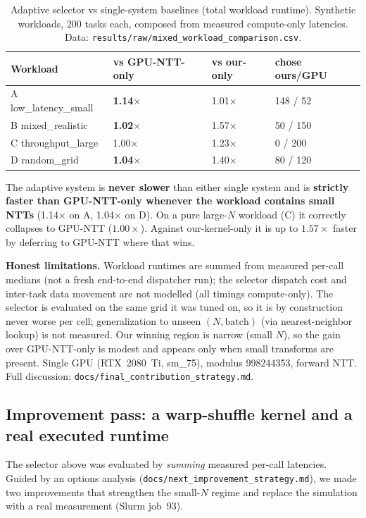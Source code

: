 \documentclass[11pt,a4paper]{article}
\begin{document}
\begin{table}[h]
\centering
\caption{Adaptive selector vs single-system baselines (total workload runtime). Synthetic
workloads, 200 tasks each, composed from measured compute-only latencies.
Data: \texttt{results/raw/mixed\_workload\_comparison.csv}.}
\begin{tabular}{L{3.6cm}R{2.4cm}R{2.2cm}R{2.4cm}}
\toprule
Workload & vs GPU-NTT-only & vs our-only & chose ours/GPU \\
\midrule
A low\_latency\_small  & \textbf{1.14$\times$} & 1.01$\times$ & 148 / 52 \\
B mixed\_realistic     & \textbf{1.02$\times$} & 1.57$\times$ & 50 / 150 \\
C throughput\_large    & 1.00$\times$          & 1.23$\times$ & 0 / 200 \\
D random\_grid         & \textbf{1.04$\times$} & 1.40$\times$ & 80 / 120 \\
\bottomrule
\end{tabular}
\end{table}

The adaptive system is \textbf{never slower} than either single system and is \textbf{strictly
faster than GPU-NTT-only whenever the workload contains small NTTs} (1.14$\times$ on A, 1.04$\times$
on D). On a pure large-$N$ workload (C) it correctly collapses to GPU-NTT ($1.00\times$). Against
our-kernel-only it is up to $1.57\times$ faster by deferring to GPU-NTT where that wins.

\textbf{Honest limitations.} Workload runtimes are summed from measured per-call medians (not a
fresh end-to-end dispatcher run); the selector dispatch cost and inter-task data movement are not
modelled (all timings compute-only). The selector is evaluated on the same grid it was tuned on, so
it is by construction never worse per cell; generalization to unseen $(N,\text{batch})$ (via
nearest-neighbor lookup) is not measured. Our winning region is narrow (small $N$), so the gain
over GPU-NTT-only is modest and appears only when small transforms are present. Single GPU
(RTX~2080~Ti, sm\_75), modulus 998244353, forward NTT. Full discussion:
\texttt{docs/final\_contribution\_strategy.md}.

\subsection{Improvement pass: a warp-shuffle kernel and a real executed runtime}
\label{sec:improvement}

The selector above was evaluated by \emph{summing} measured per-call latencies. Guided by an
options analysis (\texttt{docs/next\_improvement\_strategy.md}), we made two improvements that
strengthen the small-$N$ regime and replace the simulation with a real measurement (Slurm job~93).
\end{document}
